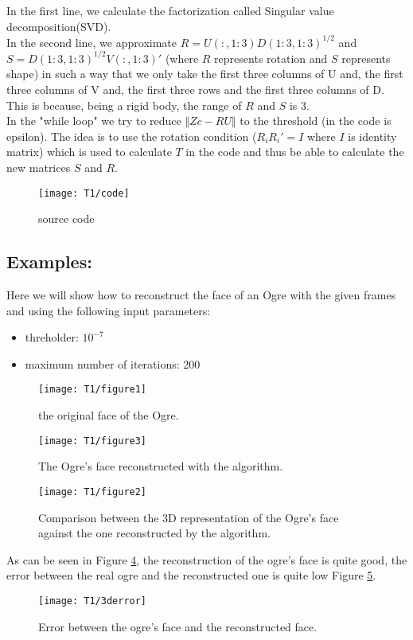 \noindent In the first line, we calculate the factorization called Singular value decomposition(SVD).\\

\noindent In the second line, we approximate $R=U(:,1:3)D(1:3, 1:3)^{1/2}$ and $S=D(1:3, 1:3)^{1/2}V(:, 1:3)'$ (where $R$ represents rotation and $S$ represents shape) in such a way that we only take the first three columns of U and, the first three columns of V and, the first three rows and the first three columns of D. This is because, being a rigid body, the range of $R$ and $S$ is 3.\\

\noindent In the "while loop" we try to reduce $\Vert Zc-RU\Vert$ to the threshold (in the code is epsilon). The idea is to use the rotation condition ($R_{i}R_{i}'=I$ where $I$ is identity matrix) which is used to calculate $T$ in the code and thus be able to calculate the new matrices $S$ and $R$.


\begin{figure}[h]
    \centering
    \texttt{[image: T1/code]}
    \caption{source code}
    \label{fig:codeT1}
\end{figure}

\subsection{Examples:}
\noindent Here we will show how to reconstruct the face of an Ogre with the given frames and using the following input parameters:

\begin{itemize}
\item threholder: $10^{-7}$
\item maximum number of iterations: 200
\end{itemize}

\begin{figure}[h]
    \centering
    \texttt{[image: T1/figure1]}
    \caption{the original face of the Ogre.}
    \label{fig:real_ogre}
\end{figure}

\begin{figure}[h]
    \centering
    \texttt{[image: T1/figure3]}
    \caption{The Ogre's face reconstructed with the algorithm.}
    \label{fig:ogre}
\end{figure}

\begin{figure}[h]
    \centering
    \texttt{[image: T1/figure2]}
    \caption{Comparison between the 3D representation of the Ogre's face against the one reconstructed by the algorithm.}
    \label{fig:real_ogre_vs_ogre}
\end{figure}
\noindent As can be seen in Figure \ref{fig:real_ogre_vs_ogre}, the reconstruction of the ogre's face is quite good, the error between the real ogre and the reconstructed one is quite low Figure \ref{fig:3d_error}.
\begin{figure}[h]
    \centering
    \texttt{[image: T1/3derror]}
    \caption{Error between the ogre's face and the reconstructed face.}
    \label{fig:3d_error}
\end{figure}
